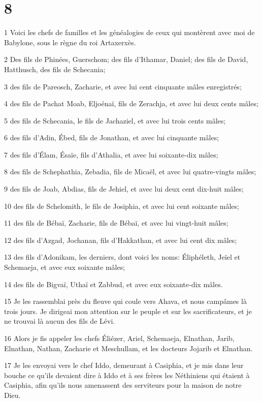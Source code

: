 \chapter{8}

\par 1 Voici les chefs de familles et les généalogies de ceux qui montèrent avec moi de Babylone, sous le règne du roi Artaxerxès.
\par 2 Des fils de Phinées, Guerschom; des fils d'Ithamar, Daniel; des fils de David, Hatthusch, des fils de Schecania;
\par 3 des fils de Pareosch, Zacharie, et avec lui cent cinquante mâles enregistrés;
\par 4 des fils de Pachat Moab, Eljoénaï, fils de Zerachja, et avec lui deux cents mâles;
\par 5 des fils de Schecania, le fils de Jachaziel, et avec lui trois cents mâles;
\par 6 des fils d'Adin, Ébed, fils de Jonathan, et avec lui cinquante mâles;
\par 7 des fils d'Élam, Ésaïe, fils d'Athalia, et avec lui soixante-dix mâles;
\par 8 des fils de Schephathia, Zebadia, fils de Micaël, et avec lui quatre-vingts mâles;
\par 9 des fils de Joab, Abdias, fils de Jehiel, et avec lui deux cent dix-huit mâles;
\par 10 des fils de Schelomith, le fils de Josiphia, et avec lui cent soixante mâles;
\par 11 des fils de Bébaï, Zacharie, fils de Bébaï, et avec lui vingt-huit mâles;
\par 12 des fils d'Azgad, Jochanan, fils d'Hakkathan, et avec lui cent dix mâles;
\par 13 des fils d'Adonikam, les derniers, dont voici les noms: Éliphéleth, Jeïel et Schemaeja, et avec eux soixante mâles;
\par 14 des fils de Bigvaï, Uthaï et Zabbud, et avec eux soixante-dix mâles.
\par 15 Je les rassemblai près du fleuve qui coule vers Ahava, et nous campâmes là trois jours. Je dirigeai mon attention sur le peuple et sur les sacrificateurs, et je ne trouvai là aucun des fils de Lévi.
\par 16 Alors je fis appeler les chefs Éliézer, Ariel, Schemaeja, Elnathan, Jarib, Elnathan, Nathan, Zacharie et Meschullam, et les docteurs Jojarib et Elnathan.
\par 17 Je les envoyai vers le chef Iddo, demeurant à Casiphia, et je mis dans leur bouche ce qu'ils devaient dire à Iddo et à ses frères les Néthiniens qui étaient à Casiphia, afin qu'ils nous amenassent des serviteurs pour la maison de notre Dieu.
